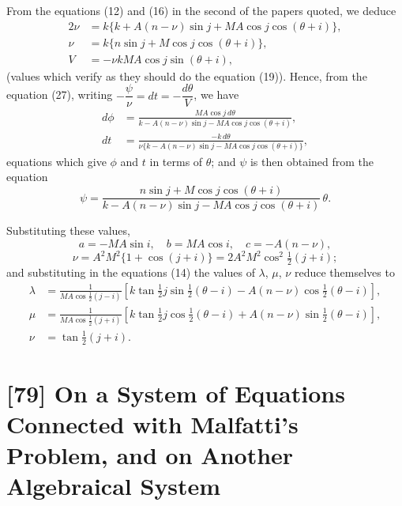\documentclass[12pt,a4paper]{article}
\begin{document}
From the equations (12) and (16) in the second of the papers quoted, we deduce
\begin{align*}
2\nu &= k\{k + A(n - \nu)\sin j + MA\cos j\cos(\theta + i)\}, \\
\nu &= k\{n\sin j + M\cos j\cos(\theta + i)\}, \\
V &= -\nu kMA\cos j\sin(\theta + i),
\end{align*}
(values which verify as they should do the equation (19)). Hence, from the equation (27), writing $-\dfrac{\psi}{\nu} = dt = -\dfrac{d\theta}{V}$, we have
\begin{align*}
d\phi &= \frac{MA\cos j\,d\theta}{k - A(n - \nu)\sin j - MA\cos j\cos(\theta + i)}, \\
dt &= \frac{-k\,d\theta}{\nu\{k - A(n - \nu)\sin j - MA\cos j\cos(\theta + i)\}},
\end{align*}
equations which give $\phi$ and $t$ in terms of $\theta$; and $\psi$ is then obtained from the equation
\[
\psi = \frac{n\sin j + M\cos j\cos(\theta + i)}{k - A(n - \nu)\sin j - MA\cos j\cos(\theta + i)}\,\theta.
\]

Substituting these values,
\[
a = -MA\sin i, \quad b = MA\cos i, \quad c = -A(n - \nu),
\]
\[
\nu = A^2M^2\{1 + \cos(j + i)\} = 2A^2M^2\cos^2\tfrac{1}{2}(j + i);
\]
and substituting in the equations (14) the values of $\lambda$, $\mu$, $\nu$ reduce themselves to
\begin{align*}
\lambda &= \frac{1}{MA\cos\tfrac{1}{2}(j - i)}\left[k\tan\tfrac{1}{2}j\sin\tfrac{1}{2}(\theta - i) - A(n - \nu)\cos\tfrac{1}{2}(\theta - i)\right], \\
\mu &= \frac{1}{MA\cos\tfrac{1}{2}(j + i)}\left[k\tan\tfrac{1}{2}j\cos\tfrac{1}{2}(\theta - i) + A(n - \nu)\sin\tfrac{1}{2}(\theta - i)\right], \\
\nu &= \tan\tfrac{1}{2}(j + i).
\end{align*}

\newpage
\section*{[79] On a System of Equations Connected with Malfatti's Problem, and on Another Algebraical System}

\bigskip
\end{document}
